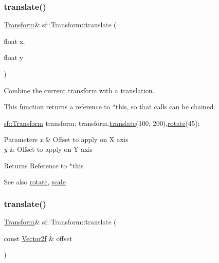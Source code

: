 \subsubsection{\texorpdfstring{translate()}{translate()}\hspace{0.1cm}{\footnotesize\ttfamily [1/2]}}
{\footnotesize\ttfamily \hyperlink{classsf_1_1_transform}{Transform}\& sf\+::\+Transform\+::translate (\begin{DoxyParamCaption}\item[{float}]{x,  }\item[{float}]{y }\end{DoxyParamCaption})}



Combine the current transform with a translation. 

This function returns a reference to $\ast$this, so that calls can be chained. 
\begin{DoxyCode}
\hyperlink{classsf_1_1_transform}{sf::Transform} transform;
transform.\hyperlink{classsf_1_1_transform_ab54f6c8070cc05e2afcb3145fbf4395a}{translate}(100, 200).\hyperlink{classsf_1_1_transform_a3e548c3c9e3fb9d4bd43cf852669e555}{rotate}(45);
\end{DoxyCode}



\begin{DoxyParams}{Parameters}
{\em x} & Offset to apply on X axis \\
\hline
{\em y} & Offset to apply on Y axis\\
\hline
\end{DoxyParams}
\begin{DoxyReturn}{Returns}
Reference to $\ast$this
\end{DoxyReturn}
\begin{DoxySeeAlso}{See also}
\hyperlink{classsf_1_1_transform_a3e548c3c9e3fb9d4bd43cf852669e555}{rotate}, \hyperlink{classsf_1_1_transform_a3f46af807f69d74120fb836334268671}{scale} 
\end{DoxySeeAlso}
\mbox{\label{classsf_1_1_transform_a452ff6e32d5120fa8c132c1bf0ad83cd}} 
\subsubsection{\texorpdfstring{translate()}{translate()}\hspace{0.1cm}{\footnotesize\ttfamily [2/2]}}
{\footnotesize\ttfamily \hyperlink{classsf_1_1_transform}{Transform}\& sf\+::\+Transform\+::translate (\begin{DoxyParamCaption}\item[{const \hyperlink{classsf_1_1_vector2}{Vector2f} \&}]{offset }\end{DoxyParamCaption})}



